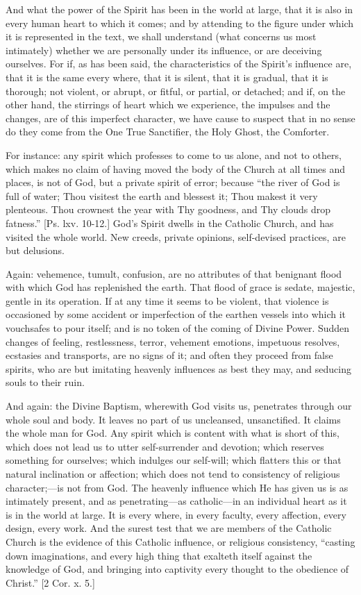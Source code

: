 And what the power of the Spirit has been in the world at large,
that it is also in every human heart to which it comes; and by
attending to the figure under which it is represented in the text, we
shall understand (what concerns us most intimately) whether we are
personally under its influence, or are deceiving ourselves. For if, as
has been said, the characteristics of the Spirit's influence are, that
it is the same every where, that it is silent, that it is gradual,
that it is thorough; not violent, or abrupt, or fitful, or partial, or
detached; and if, on the other hand, the stirrings of heart which we
experience, the impulses and the changes, are of this imperfect
character, we have cause to suspect that in no sense do they come from
the One True Sanctifier, the Holy Ghost, the Comforter.

For instance: any spirit which professes to come to us alone, and
not to others, which makes no claim of having moved the body of the
Church at all times and places, is not of God, but a private spirit of
error; because ``the river of God is full of water; Thou visitest
the earth and blessest it; Thou makest it very plenteous. Thou
crownest the year with Thy goodness, and Thy clouds drop
fatness.'' [Ps. lxv. 10-12.] God's Spirit dwells in the Catholic
Church, and has visited the whole world. New creeds, private opinions,
self-devised practices, are but delusions.

Again: vehemence, tumult, confusion, are no attributes of that
benignant flood with which God has replenished the earth. That flood
of grace is sedate, majestic, gentle in its operation. If at any time
it seems to be violent, that violence is occasioned by some accident
or imperfection of the earthen vessels into which it vouchsafes to
pour itself; and is no token of the coming of Divine Power. Sudden
changes of feeling, restlessness, terror, vehement emotions, impetuous
resolves, ecstasies and transports, are no signs of it; and often they
proceed from false spirits, who are but imitating heavenly influences
as best they may, and seducing souls to their ruin.

And again: the Divine Baptism, wherewith God visits us, penetrates
through our whole soul and body. It leaves no part of us uncleansed,
unsanctified. It claims the whole man for God. Any spirit which is
content with what is short of this, which does not lead us to utter
self-surrender and devotion; which reserves something for ourselves;
which indulges our self-will; which flatters this or that natural
inclination or affection; which does not tend to consistency of
religious character;—is not from God. The heavenly influence which
He has given us is as intimately present, and as penetrating—as
catholic—in an individual heart as it is in the world at large. It
is every where, in every faculty, every affection, every design, every
work. And the surest test that we are members of the Catholic Church
is the evidence of this Catholic influence, or religious consistency,
``casting down imaginations, and every high thing that exalteth
itself against the knowledge of God, and bringing into captivity every
thought to the obedience of Christ.'' [2 Cor. x. 5.]

